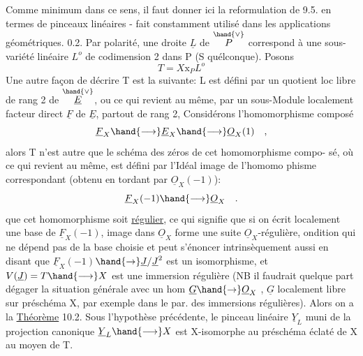
Comme minimum dans ce sens, il faut  donner ici la reformulation de 9.5.
en termes de pinceaux linéaires  -  fait constamment utilisé dans les
applications géométriques.
0.2.  Par polarité, une droite $\underline{L}$  de $\overset{\hand{\vee}}{P}$  correspond à une sous-variété
linéaire $L^{o}$ de codimension 2 dans P  (S quélconque).  Posons
\[ T = X\mathrm{x}_{P}L^{o} \]
\margin{\unsure{$-\,\cdot$}}Une autre façon  de décrire T est la suivante:  L  est défini par un
quotient loc libre de rang 2 de $\overset{\hand{\vee}}{\underline{E}}$, ou ce qui revient au même, par un
sous-Module localement facteur direct  $\underline{F}$ de $\underline{E}$, partout de rang 2,
Considérons  l'homomorphisme composé
\[ \underline{F}_{X} \hand{\longrightarrow} \underline{E}_{X} \hand{\longrightarrow} \underline{O}_{X}(1) \quad , \]
alors  T n'est autre que  le schéma des zéros de cet homomorphisme compo-%
sé, où ce qui revient au même, est défini par l'Idéal  image de l'homomo%
phisme correspondant (obtenu en tordant par $\underline{O}_{X}(-1)$):
\[ \underline{F}_{X}(-1) \hand{\longrightarrow} \underline{O}_{X} \quad . \]
 que cet homomorphisme soit \uline{régulier}, ce qui signifie
que  si on écrit localement une base  de $\underline{F}_{X}(-1)$,   image dans $\underline{O}_{X}$\hand{\unsure{$\curvearrowleft$|$\widehat{\ }$}}
forme une suite $\underline{O}_{X}$-régulière, ondition qui ne dépend pas de la base
choisie et peut s'énoncer intrinsèquement aussi en disant que
$\underline{F}_{X}(-1)$$\hand{\to} \underline{J}/\underline{J}^{2}$  est un isomorphisme, et  $V(\underline{J})=T \hand{\longrightarrow} X$  est  une immersion
\margin{$\|$} régulière  (NB il  faudrait quelque part dégager la situation
générale avec un hom  $\underline{G} \hand{\to} \underline{O}_{X}$ , $\underline{G}$ localement libre sur préschéma X, par
exemple dans le par. des immersions régulières).  Alors on a la
 \uline{Théorème}  10.2.   Sous l'hypothèse précédente, le pinceau
linéaire $\underline{Y}_{L}$  muni de la projection canonique $\underline{Y}_{L} \hand{\longrightarrow} X$  est  X-isomorphe
 au préschéma éclaté  de X au moyen de T.

